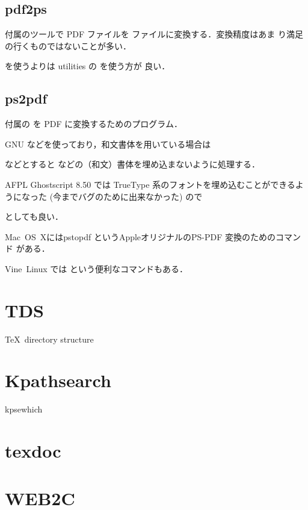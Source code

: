 \subsection{pdf2ps}

\GS 付属のツールで PDF ファイルを \PS ファイルに変換する．変換精度はあま
り満足の行くものではないことが多い．

 を使うよりは \Xpdf utilities の  を使う方が
良い．


\subsection{ps2pdf}

\GS 付属の \PS を PDF に変換するためのプログラム．

GNU  などを使っており，和文書体を用いている場合は
\begin{InTerm}
\end{InTerm}
などとすると  などの（和文）書体を埋め込まないように処理する．

AFPL Ghostscript 8.50 では TrueType 系のフォントを埋め込むことができるよ
うになった (今までバグのために出来なかった) ので
\begin{InTerm}
\end{InTerm}
としても良い．

Mac~OS~Xにはpstopdf というAppleオリジナルのPS-PDF 変換のためのコマンド
がある．

Vine~Linux では  という便利なコマンドもある．


\section{TDS}

\TeX\ directory structure

\section{Kpathsearch}

kpsewhich 

\section{texdoc}



\section{WEB2C}


